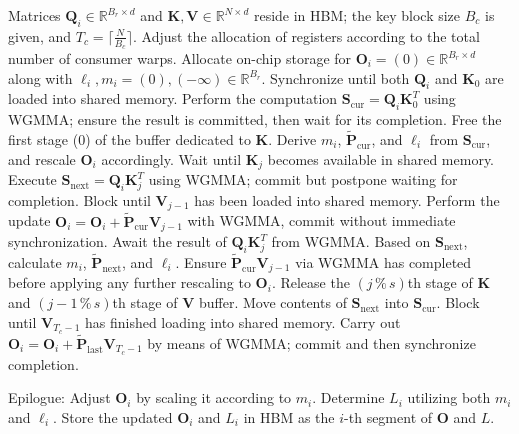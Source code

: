 \begin{algorithm}[H]
    \caption{\small\label{alg:flash3_wgmma}\textsc{FlashAttention-3} consumer warpgroup forward pass}
    \begin{algorithmic}[1]
      \REQUIRE Matrices $\mathbf{Q}_i \in \mathbb{R}^{B_r \times d}$ and $\mathbf{K}, \mathbf{V} \in \mathbb{R}^{N \times d}$ reside in HBM; the key block size $B_c$ is given, and $T_c = \lceil \frac{N}{B_c} \rceil$.
      \STATE Adjust the allocation of registers according to the total number of consumer warps.
      \STATE Allocate on-chip storage for $\mathbf{O}_i = (0) \in \mathbb{R}^{B_r \times d}$ along with $\ell_i, m_i = (0), (-\infty) \in \mathbb{R}^{B_r}$.
      \STATE Synchronize until both $\mathbf{Q}_i$ and $\mathbf{K}_0$ are loaded into shared memory.
      \STATE Perform the computation $\mathbf{S}_{\mathrm{cur}} = \mathbf{Q}_i \mathbf{K}_0^T$ using WGMMA; ensure the result is committed, then wait for its completion.
      \STATE Free the first stage ($0$) of the buffer dedicated to $\mathbf{K}$.
      \STATE Derive $m_{i}$, $\tilde{\mathbf{P}}_{\mathrm{cur}}$, and $\ell_{i}$ from $\mathbf{S}_{\mathrm{cur}}$, and rescale $\mathbf{O}_i$ accordingly.
        \STATE Wait until $\mathbf{K}_j$ becomes available in shared memory.
        \label{code:mainloop_start}
        \STATE Execute $\mathbf{S}_{\mathrm{next}} = \mathbf{Q}_i \mathbf{K}_{j}^T$ using WGMMA; commit but postpone waiting for completion. \label{code:first_wgmma}
        \STATE Block until $\mathbf{V}_{j-1}$ has been loaded into shared memory.
        \STATE Perform the update $\mathbf{O}_{i} = \mathbf{O}_{i} + \tilde{\mathbf{P}}_{\mathrm{cur}} \mathbf{V}_{j-1}$ with WGMMA, commit without immediate synchronization. \label{code:second_wgmma}
        \STATE Await the result of $\mathbf{Q}_i \mathbf{K}_{j}^T$ from WGMMA.
        \STATE Based on $\mathbf{S}_{\mathrm{next}}$, calculate $m_{i}$, $\tilde{\mathbf{P}}_{\mathrm{next}}$, and $\ell_{i}$. \label{code:softmax}
        \STATE Ensure $\tilde{\mathbf{P}}_{\mathrm{cur}} \mathbf{V}_{j-1}$ via WGMMA has completed before applying any further rescaling to $\mathbf{O}_i$.
        \STATE Release the $(j\,\%\,s)$th stage of $\mathbf{K}$ and $(j-1\,\%\,s)$th stage of $\mathbf{V}$ buffer.
        \STATE Move contents of $\mathbf{S}_{\mathrm{next}}$ into $\mathbf{S}_{\mathrm{cur}}$.
        \label{code:mainloop_end}
      \ENDFOR \STATE Block until $\mathbf{V}_{T_c - 1}$ has finished loading into shared memory.
      \STATE Carry out
      $\mathbf{O}_{i} = \mathbf{O}_{i} + \tilde{\mathbf{P}}_{\mathrm{last}} \mathbf{V}_{T_c - 1}$ by means of WGMMA; commit and then synchronize completion.

\STATE Epilogue: Adjust $\mathbf{O}_{i}$ by scaling it according to $m_{i}$. Determine $L_{i}$ utilizing both $m_{i}$ and $\ell_{i}$.
      Store the updated $\mathbf{O}_{i}$ and $L_{i}$ in HBM as the $i$-th segment of $\mathbf{O}$ and $L$.
    \end{algorithmic}
  \end{algorithm}

